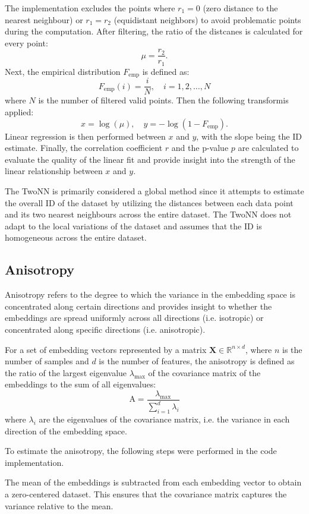 \documentclass[
  11pt,
  a4paper,
  onecolumn]{article}
\begin{document}
The implementation excludes the points where $r_1 = 0$ (zero distance to the nearest neighbour) or $r_1 = r_2$ (equidistant neighbors) to avoid problematic points during the computation. After filtering, the ratio of the distcanes is calculated for every point:
\[ 
\mu = \frac{r_2}{r_1} . 
\]
Next, the empirical distribution $F_{\text{emp}}$ is defined as:
\[
F_{\text{emp}}(i) = \frac{i}{N}, \quad i = 1, 2, \ldots, N
\]
where $ N $ is the number of filtered valid points. Then the following transformis applied:
\[
x = \log(\mu), \quad y = -\log(1 - F_{\text{emp}}).
\]
Linear regression is then performed between $x$ and $y$, with the slope being the ID estimate.  Finally, the correlation coefficient $r$ and the p-value $p$ are calculated to evaluate the quality of the linear fit and provide insight into the strength of the linear relationship between $x$ and $y$.

The TwoNN is primarily considered a global method since it attempts to estimate the overall ID of the dataset by utilizing the distances between each data point and its two nearest neighbours across the entire dataset. The TwoNN does not adapt to the local variations of the dataset and assumes that the ID is homogeneous across the entire dataset. 


\subsection{Anisotropy}
Anisotropy refers to the degree to which the variance in the embedding space is concentrated along certain directions and provides insight to whether the embeddings are spread uniformly across all directions (i.e. isotropic) or concentrated along specific directions (i.e. anisotropic). 

For a set of embedding vectors represented by a matrix $\mathbf{X} \in \mathbb{R}^{n \times d}$, where $n$ is the number of samples and $d$ is the number of features, the anisotropy is defined as the ratio of the largest eigenvalue $\lambda_{\text{max}}$ of the covariance matrix of the embeddings to the sum of all eigenvalues:
\[
\text{A} = \frac{\lambda_{\text{max}}}{\sum_{i=1}^{d} \lambda_i}
\]
where $ \lambda_i $ are the eigenvalues of the covariance matrix, i.e. the variance in each direction of the embedding space.

To estimate the anisotropy, the following steps were performed in the code implementation.

The mean of the embeddings is subtracted from each embedding vector to obtain a zero-centered dataset. This ensures that the covariance matrix captures the variance relative to the mean.
\end{document}
